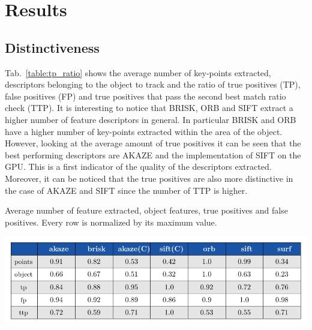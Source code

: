 \section{Results}

\subsection{Distinctiveness}


Tab.~\ref{table:tp_ratio} shows the average number of key-points extracted, descriptors belonging to the object to track and the ratio of true positives (TP), false positives (FP) and true positives that pass the second best match ratio check (TTP). It is interesting to notice that BRISK, ORB and SIFT extract a higher number of feature descriptors in general. In particular BRISK and ORB have a higher number of key-points extracted within the area of the object. However, looking at the average amount of true positives it can be seen that the best performing descriptors are AKAZE and the implementation of SIFT on the GPU. This is a first indicator of the quality of the descriptors extracted. Moreover, it can be noticed that the true positives are also more distinctive in the case of AKAZE and SIFT since the number of TTP is higher.

\begin{table}[b]
\caption{Average number of feature extracted, object features, true positives and false positives. Every row is normalized by its maximum value.}
\vspace{-2mm} 
\centerline{%
		\includegraphics[width=0.98\linewidth]{tables/descriptivness_ratio.pdf}}
    \vspace{-2mm} 
	\label{table:tp_ratio}
\end{table}

